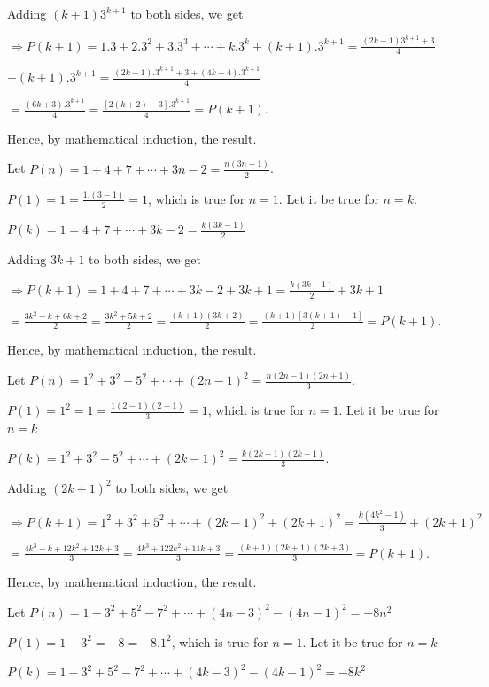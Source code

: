   Adding $(k + 1)3^{k + 1}$ to both sides, we get

  $\Rightarrow P(k + 1) = 1.3 + 2.3^2 + 3.3^3 + \cdots + k.3^k + (k + 1).3^{k + 1} = \frac{(2k - 1)3^{k + 1}
    + 3}{4}$\

  $+ (k
  + 1).3^{k + 1} = \frac{(2k - 1).3^{k + 1} + 3 + (4k + 4).3^{k + 1}}{4}$

  $= \frac{(6k + 3).3^{k + 1}}{4} = \frac{[2(k + 2) - 3].3^{k + 1}}{4} = P(k + 1)$.

  Hence, by mathematical induction, the result.
\item Let $P(n) = 1 + 4 + 7 + \cdots + 3n - 2 = \frac{n(3n - 1)}{2}$.

  $P(1) =  1 = \frac{1.(3 - 1)}{2} = 1$, which is true for $n = 1$. Let it be true for $n = k$.

  $P(k) = 1 = 4 + 7 + \cdots + 3k - 2 = \frac{k(3k - 1)}{2}$

  Adding $3k + 1$ to both sides, we get

  $\Rightarrow P(k + 1) = 1 + 4 + 7 + \cdots + 3k - 2 + 3k + 1 = \frac{k(3k - 1)}{2} + 3k + 1$

  $= \frac{3k^2 -
  k + 6k + 2}{2} = \frac{3k^2 + 5k + 2}{2} = \frac{(k + 1)(3k + 2)}{2} = \frac{(k + 1)[3(k + 1) - 1]}{2} =
  P(k + 1)$.

  Hence, by mathematical induction, the result.
\item Let $P(n) = 1^2 + 3^2 + 5^2 + \cdots + (2n - 1)^2 = \frac{n(2n - 1)(2n + 1)}{3}$.

  $P(1) = 1^2 = 1 = \frac{1(2 - 1)(2 + 1)}{3} = 1$, which is true for $n = 1$. Let it be true for $n = k$

  $P(k) = 1^2 + 3^2 + 5^2 + \cdots + (2k - 1)^2 = \frac{k(2k - 1)(2k + 1)}{3}$.

  Adding $(2k + 1)^2$ to both sides, we get

  $\Rightarrow P(k + 1) = 1^2 + 3^2 + 5^2 + \cdots + (2k - 1)^2 + (2k + 1)^2 = \frac{k(4k^2 - 1)}{3} + (2k +
  1)^2$

  $= \frac{4k^3 - k + 12k^2 + 12k + 3}{3} = \frac{4k^3 + 122k^2 + 11k + 3}{3} = \frac{(k + 1)(2k + 1)(2k
    + 3)}{3} = P(k + 1)$.

  Hence, by mathematical induction, the result.
\item Let $P(n) = 1 - 3^2 + 5^2 - 7^2 + \cdots + (4n - 3)^2 - (4n - 1)^2 = -8n^2$

  $P(1) = 1 - 3^2 = -8 = -8.1^2$, which is true for $n = 1$. Let it be true for $n = k$.

  $P(k) = 1 - 3^2 + 5^2 - 7^2 + \cdots + (4k - 3)^2 - (4k - 1)^2 = -8k^2$

